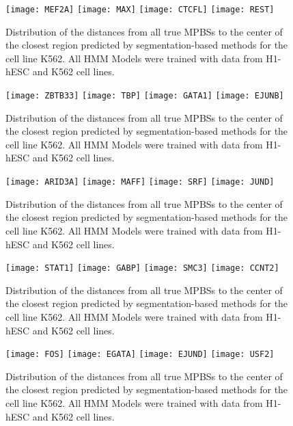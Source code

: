 \documentclass[11pt,a4]{article}
\begin{document}
\begin{figure}[h]
\centering
    \texttt{[image: MEF2A]}
    \texttt{[image: MAX]}
    \texttt{[image: CTCFL]}
    \texttt{[image: REST]}
\caption{Distribution of the distances from all true MPBSs to the center of the closest region predicted by segmentation-based methods for the cell line K562. All HMM Models were trained with data from H1-hESC and K562 cell lines.}
\label{fig:boxplot.K562.fdr_4.1}
\end{figure}

\begin{figure}[h]
\centering
    \texttt{[image: ZBTB33]}
    \texttt{[image: TBP]}
    \texttt{[image: GATA1]}
    \texttt{[image: EJUNB]}
\caption{Distribution of the distances from all true MPBSs to the center of the closest region predicted by segmentation-based methods for the cell line K562. All HMM Models were trained with data from H1-hESC and K562 cell lines.}
\label{fig:boxplot.K562.fdr_4.2}
\end{figure}

\begin{figure}[h]
\centering
    \texttt{[image: ARID3A]}
    \texttt{[image: MAFF]}
    \texttt{[image: SRF]}
    \texttt{[image: JUND]}
\caption{Distribution of the distances from all true MPBSs to the center of the closest region predicted by segmentation-based methods for the cell line K562. All HMM Models were trained with data from H1-hESC and K562 cell lines.}
\label{fig:boxplot.K562.fdr_4.3}
\end{figure}

\begin{figure}[h]
\centering
    \texttt{[image: STAT1]}
    \texttt{[image: GABP]}
    \texttt{[image: SMC3]}
    \texttt{[image: CCNT2]}
\caption{Distribution of the distances from all true MPBSs to the center of the closest region predicted by segmentation-based methods for the cell line K562. All HMM Models were trained with data from H1-hESC and K562 cell lines.}
\label{fig:boxplot.K562.fdr_4.4}
\end{figure}

\begin{figure}[h]
\centering
    \texttt{[image: FOS]}
    \texttt{[image: EGATA]}
    \texttt{[image: EJUND]}
    \texttt{[image: USF2]}
\caption{Distribution of the distances from all true MPBSs to the center of the closest region predicted by segmentation-based methods for the cell line K562. All HMM Models were trained with data from H1-hESC and K562 cell lines.}
\label{fig:boxplot.K562.fdr_4.5}
\end{figure}
\end{document}

